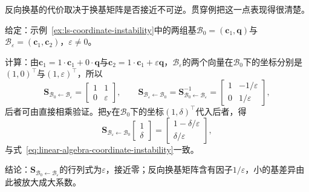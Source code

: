 反向换基的代价取决于换基矩阵是否接近不可逆。贯穿例把这一点表现得很清楚。
\begin{example}[近共线基之间的换基]
\label{ex:ls-nearly-collinear-change-of-basis}
给定：示例~\ref{ex:ls-coordinate-instability}中的两组基$\mathcal B_0=(\bm c_1,\bm q)$与$\mathcal B_\varepsilon=(\bm c_1,\bm c_2)$，$\varepsilon\neq0$。

计算：由$\bm c_1=1\cdot\bm c_1+0\cdot\bm q$与$\bm c_2=1\cdot\bm c_1+\varepsilon\bm q$，$\mathcal B_\varepsilon$的两个向量在$\mathcal B_0$下的坐标分别是$(1,0)^{\top}$与$(1,\varepsilon)^{\top}$，所以
\[
 \bm S_{\mathcal B_0\leftarrow\mathcal B_\varepsilon}
 =\begin{bmatrix}1&1\\0&\varepsilon\end{bmatrix},
 \qquad
 \bm S_{\mathcal B_\varepsilon\leftarrow\mathcal B_0}
 =\bm S_{\mathcal B_0\leftarrow\mathcal B_\varepsilon}^{-1}
 =\begin{bmatrix}1&-1/\varepsilon\\0&1/\varepsilon\end{bmatrix},
\]
后者可由直接相乘验证。把$\bm y$在$\mathcal B_0$下的坐标$(1,\delta)^{\top}$代入后者，得
\[
 \bm S_{\mathcal B_\varepsilon\leftarrow\mathcal B_0}\begin{bmatrix}1\\\delta\end{bmatrix}
 =\begin{bmatrix}1-\delta/\varepsilon\\\delta/\varepsilon\end{bmatrix},
\]
与式~\eqref{eq:linear-algebra-coordinate-instability}一致。

结论：$\bm S_{\mathcal B_0\leftarrow\mathcal B_\varepsilon}$的行列式为$\varepsilon$，接近零；反向换基矩阵含有因子$1/\varepsilon$，小的基差异由此被放大成大系数。
\end{example}

